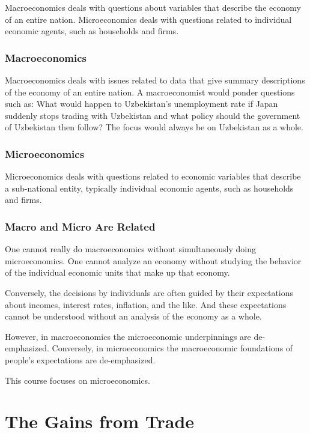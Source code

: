 \documentclass[
  letterpaper,
]{book}
\begin{document}
Macroeconomics deals with questions about variables that describe the
economy of an entire nation. Microeconomics deals with questions related
to individual economic agents, such as households and firms.

\subsection{Macroeconomics}\label{macroeconomics}

Macroeconomics deals with issues related to data that give summary
descriptions of the economy of an entire nation. A macroeconomist would
ponder questions such as: What would happen to Uzbekistan's unemployment
rate if Japan suddenly stops trading with Uzbekistan and what policy
should the government of Uzbekistan then follow? The focus would always
be on Uzbekistan as a whole.

\subsection{Microeconomics}\label{microeconomics}

Microeconomics deals with questions related to economic variables that
describe a sub-national entity, typically individual economic agents,
such as households and firms.

\subsection{Macro and Micro Are
Related}\label{macro-and-micro-are-related}

One cannot really do macroeconomics without simultaneously doing
microeconomics. One cannot analyze an economy without studying the
behavior of the individual economic units that make up that economy.

Conversely, the decisions by individuals are often guided by their
expectations about incomes, interest rates, inflation, and the like. And
these expectations cannot be understood without an analysis of the
economy as a whole.

However, in macroeconomics the microeconomic underpinnings are
de-emphasized. Conversely, in microeconomics the macroeconomic
foundations of people's expectations are de-emphasized.

This course focuses on microeconomics.


\chapter{The Gains from Trade}\label{sec-trade}
\end{document}
